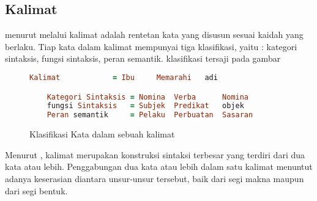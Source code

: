 \subsection{Kalimat}
menurut \citet{alwi} melalui \citet{admodjo} kalimat adalah rentetan kata yang disusun sesuai kaidah yang berlaku. Tiap kata dalam kalimat mempunyai tiga klasifikasi, yaitu : kategori sintaksis, fungsi sintaksis, peran semantik. klasifikasi tersaji pada gambar 

\begin{figure}[ht]
	\centering
	\begin{lstlisting}[language=Prolog,xleftmargin=0pt]
	Kalimat            = Ibu     Memarahi   adi	

	Kategori Sintaksis = Nomina  Verba      Nomina 
	fungsi Sintaksis   = Subjek  Predikat   objek
	Peran semantik     = Pelaku  Perbuatan  Sasaran
	\end{lstlisting}
\caption{Klasifikasi Kata dalam sebuah kalimat}
\label{fig:klasifikasi_kata_dalam_kalimat}
\end{figure}

Menurut \citet{alwi}, kalimat merupakan konstruksi sintaksi terbesar yang terdiri dari dua kata atau lebih. Penggabungan dua kata atau lebih dalam satu kalimat menuntut adanya keserasian diantara unsur-unsur tersebut, baik dari segi makna maupun dari segi bentuk.

